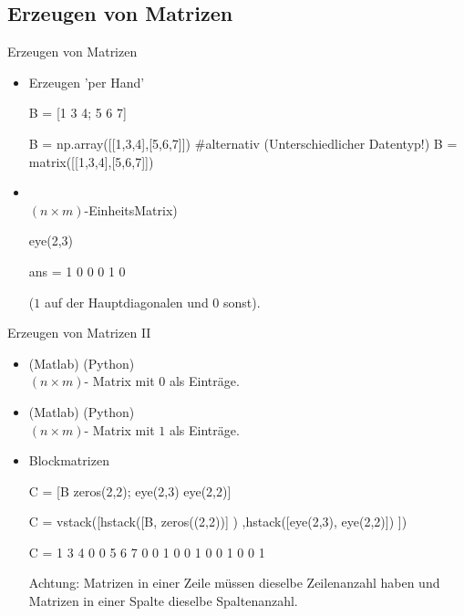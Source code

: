 \documentclass[hyperref={xetex}]{beamer}
\begin{document}
\subsection{Erzeugen von Matrizen}
%
%
\begin{frame}[fragile]{Erzeugen von Matrizen}
\begin{itemize}
\item Erzeugen 'per Hand'
\begin{matlabin}
B = [1 3 4; 5 6 7]
\end{matlabin}
\begin{pyin}
B = np.array([[1,3,4],[5,6,7]])
#alternativ (Unterschiedlicher Datentyp!)
B = matrix([[1,3,4],[5,6,7]]) 
\end{pyin}

\item {}\\ $(n \times m)$-EinheitsMatrix)
\begin{matlabin}
eye(2,3)
\end{matlabin}
\begin{matlab}
ans =
     1     0     0
     0     1     0 
\end{matlab}

($1$ auf der Hauptdiagonalen und 0 sonst).
\end{itemize}
\end{frame} 
%
%
\begin{frame}[fragile]{Erzeugen von Matrizen II}
\begin{itemize}
\item {}(Matlab) (Python) \\$(n \times m)$- Matrix mit $0$ als Einträge.
\item {}(Matlab) (Python)\\$(n \times m)$- Matrix mit $1$ als Einträge.
\item Blockmatrizen
\begin{matlabin}
C = [B zeros(2,2); eye(2,3) eye(2,2)]
\end{matlabin}
\begin{pyin}
C = vstack([hstack([B, zeros((2,2))] ) ,hstack([eye(2,3), eye(2,2)]) ])
\end{pyin}
\begin{matlab}
C =
     1     3     4     0     0
     5     6     7     0     0
     1     0     0     1     0
     0     1     0     0     1 
\end{matlab}

\alert{Achtung:} Matrizen in einer Zeile müssen dieselbe
Zeilenanzahl haben und Matrizen in einer Spalte dieselbe Spaltenanzahl.
\end{itemize}
\end{frame} 
\end{document}
